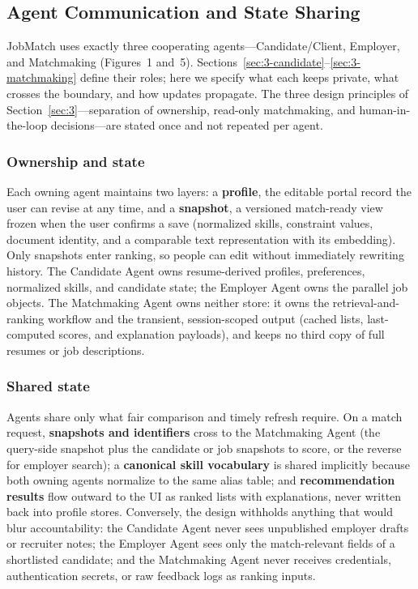 \subsection{Agent Communication and State Sharing}\label{sec:3-communication}

JobMatch uses exactly three cooperating agents---Candidate/Client, Employer, and Matchmaking (Figures~1 and~5).
Sections~\ref{sec:3-candidate}--\ref{sec:3-matchmaking} define their roles; here we specify what each keeps private, what crosses the boundary, and how updates propagate.
The three design principles of Section~\ref{sec:3}---separation of ownership, read-only matchmaking, and human-in-the-loop decisions---are stated once and not repeated per agent.

\subsubsection{Ownership and state}\label{sec:3-ownership}
Each owning agent maintains two layers: a \textbf{profile}, the editable portal record the user can revise at any time, and a \textbf{snapshot}, a versioned match-ready view frozen when the user confirms a save (normalized skills, constraint values, document identity, and a comparable text representation with its embedding).
Only snapshots enter ranking, so people can edit without immediately rewriting history.
The Candidate Agent owns resume-derived profiles, preferences, normalized skills, and candidate state; the Employer Agent owns the parallel job objects.
The Matchmaking Agent owns neither store: it owns the retrieval-and-ranking workflow and the transient, session-scoped output (cached lists, last-computed scores, and explanation payloads), and keeps no third copy of full resumes or job descriptions.

\subsubsection{Shared state}\label{sec:3-shared}
Agents share only what fair comparison and timely refresh require.
On a match request, \textbf{snapshots and identifiers} cross to the Matchmaking Agent (the query-side snapshot plus the candidate or job snapshots to score, or the reverse for employer search); a \textbf{canonical skill vocabulary} is shared implicitly because both owning agents normalize to the same alias table; and \textbf{recommendation results} flow outward to the UI as ranked lists with explanations, never written back into profile stores.
Conversely, the design withholds anything that would blur accountability: the Candidate Agent never sees unpublished employer drafts or recruiter notes; the Employer Agent sees only the match-relevant fields of a shortlisted candidate; and the Matchmaking Agent never receives credentials, authentication secrets, or raw feedback logs as ranking inputs.

